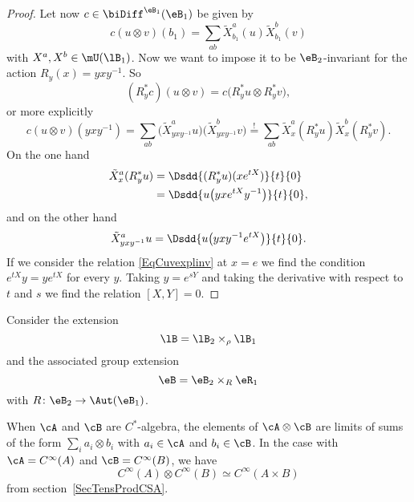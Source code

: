 \begin{proof}
	Let now $c\in\biDiff^{\eB_1}(\eB_1)$ be given by
	\begin{equation}
		c(u\otimes v)(b_1)=\sum_{ab}\tilde X_{b_1}^a(u)\tilde X_{b_1}^b(v)
	\end{equation}
	with $X^a,X^b\in\mU(\lB_1)$. Now we want to impose it to be $\eB_2$-invariant for the action $R_y(x)=yxy^{-1}$. So
	\begin{equation}
		(R_y^*c)(u\otimes v)=c\big( R^*_yu\otimes R^*_yv \big),
	\end{equation}
	or more explicitly
	\begin{equation}		\label{EqCuvexplinv}
		c(u\otimes v)(yxy^{-1})=\sum_{ab}\big( \tilde X^a_{yxy^{-1}}u \big)\big( \tilde X^b_{yxy^{-1}}v \big)
		\stackrel{!}{=}\sum_{ab}\tilde X^a_x(R^*_yu)\tilde X^b_x(R^*_yv).
	\end{equation}
	On the one hand
	\begin{equation}
		\begin{aligned}[]
			\tilde X_x^a(R^*_yu)&=\Dsdd{ (R^*_yu)(x e^{tX}) }{t}{0}\\
			&=\Dsdd{ u\big( yx e^{tX}y^{-1} \big) }{t}{0},
		\end{aligned}
	\end{equation}
	and on the other hand
	\begin{equation}
		\tilde X^a_{yxy^{-1}}u=\Dsdd{ u\big( yxy^{-1} e^{tX} \big) }{t}{0}.
	\end{equation}
	If we consider the relation \eqref{EqCuvexplinv} at $x=e$ we find the condition $ e^{tX}y=y e^{tX}$ for every $y$. Taking $y= e^{sY}$ and taking the derivative with respect to $t$ and $s$ we find the relation $[X,Y]=0$.
\end{proof}

Consider the extension
\begin{equation}
	\lB=\lB_2\times_{\rho}\lB_1
\end{equation}
and the associated group extension
\begin{equation}
	\eB=\eB_2\times_R\eR_1
\end{equation}
with $R\colon \eB_2\to \Aut(\eB_1)$.

When $\cA$ and $\cB$ are $C^*$-algebra, the elements of $\cA\otimes \cB$ are limits of sums of the form $\sum_ia_i\otimes b_i$ with $a_i\in\cA$ and $b_i\in\cB$. In the case with $\cA= C^{\infty}(A)$ and $\cB= C^{\infty}(B)$, we have
\begin{equation}		\label{EqCABsimeqCACB}
	C^{\infty}(A)\otimes C^{\infty}(B)\simeq C^{\infty}(A\times B)
\end{equation}
from section~\ref{SecTensProdCSA}.

